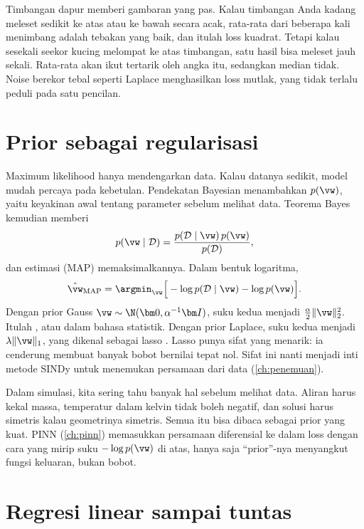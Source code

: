Timbangan dapur memberi gambaran yang pas. Kalau timbangan Anda kadang meleset sedikit ke atas
atau ke bawah secara acak, rata-rata dari beberapa kali menimbang adalah tebakan yang baik, dan
itulah loss kuadrat. Tetapi kalau sesekali seekor kucing melompat ke atas timbangan, satu hasil
bisa meleset jauh sekali. Rata-rata akan ikut tertarik oleh angka itu, sedangkan median tidak.
Noise berekor tebal seperti Laplace menghasilkan loss mutlak, yang tidak terlalu peduli pada
satu pencilan.

\section{Prior sebagai regularisasi}
\label{sec:prior}

Maximum likelihood hanya mendengarkan data. Kalau datanya sedikit, model mudah percaya pada
kebetulan. Pendekatan Bayesian menambahkan  $p(\vw)$, yaitu keyakinan awal tentang
parameter sebelum melihat data. Teorema Bayes kemudian memberi 
\[
p(\vw\mid\mathcal{D})=\frac{p(\mathcal{D}\mid\vw)\,p(\vw)}{p(\mathcal{D})},
\]
dan estimasi  (MAP) memaksimalkannya. Dalam bentuk logaritma,
\begin{equation}
\hat\vw_{\mathrm{MAP}}=\argmin_{\vw}\Big[-\log p(\mathcal{D}\mid\vw)-\log p(\vw)\Big].
\end{equation}
Dengan prior Gauss $\vw\sim\N(\bm 0,\alpha^{-1}\bm I)$, suku kedua menjadi $\tfrac\alpha2\|\vw\|_2^2$.
Itulah , atau  dalam bahasa statistik. Dengan prior
Laplace, suku kedua menjadi $\lambda\|\vw\|_1$, yang dikenal sebagai lasso \citep{tibshirani1996}.
Lasso punya sifat yang menarik: ia cenderung membuat banyak bobot bernilai tepat nol. Sifat ini
nanti menjadi inti metode SINDy untuk menemukan persamaan dari data (\cref{ch:penemuan}).

Dalam simulasi, kita sering tahu banyak hal sebelum melihat data. Aliran harus kekal massa,
temperatur dalam kelvin tidak boleh negatif, dan solusi harus simetris kalau geometrinya
simetris. Semua itu bisa dibaca sebagai prior yang kuat. PINN (\cref{ch:pinn}) memasukkan
persamaan diferensial ke dalam loss dengan cara yang mirip suku $-\log p(\vw)$ di atas, hanya
saja ``prior''-nya menyangkut fungsi keluaran, bukan bobot.

\section{Regresi linear sampai tuntas}

